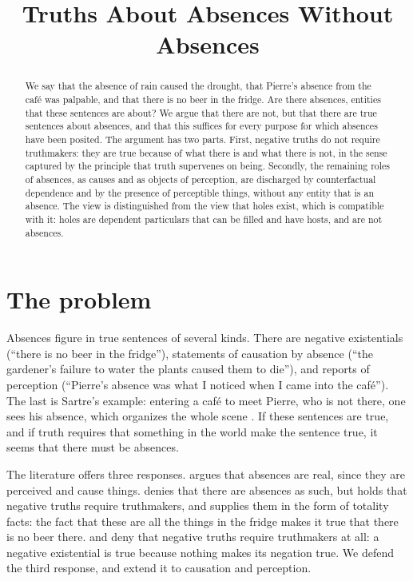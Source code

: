 \documentclass{situationist-preprint}
\title{Truths About Absences Without Absences}
\begin{document}
\maketitle

\begin{abstract}
We say that the absence of rain caused the drought, that Pierre's absence from the café was palpable, and that there is no beer in the fridge. Are there absences, entities that these sentences are about? We argue that there are not, but that there are true sentences about absences, and that this suffices for every purpose for which absences have been posited. The argument has two parts. First, negative truths do not require truthmakers: they are true because of what there is and what there is not, in the sense captured by the principle that truth supervenes on being. Secondly, the remaining roles of absences, as causes and as objects of perception, are discharged by counterfactual dependence and by the presence of perceptible things, without any entity that is an absence. The view is distinguished from the view that holes exist, which is compatible with it: holes are dependent particulars that can be filled and have hosts, and are not absences.
\end{abstract}

\section{The problem}

Absences figure in true sentences of several kinds. There are negative existentials (\enquote{there is no beer in the fridge}), statements of causation by absence (\enquote{the gardener's failure to water the plants caused them to die}), and reports of perception (\enquote{Pierre's absence was what I noticed when I came into the café}). The last is Sartre's example: entering a café to meet Pierre, who is not there, one sees his absence, which organizes the whole scene \citep{Sartre1943}. If these sentences are true, and if truth requires that something in the world make the sentence true, it seems that there must be absences.

The literature offers three responses. \citet{Kukso2006} argues that absences are real, since they are perceived and cause things. \citet{Armstrong2004} denies that there are absences as such, but holds that negative truths require truthmakers, and supplies them in the form of totality facts: the fact that these are all the things in the fridge makes it true that there is no beer there. \citet{Lewis2001} and \citet{Bigelow1988} deny that negative truths require truthmakers at all: a negative existential is true because nothing makes its negation true. We defend the third response, and extend it to causation and perception.
\end{document}
